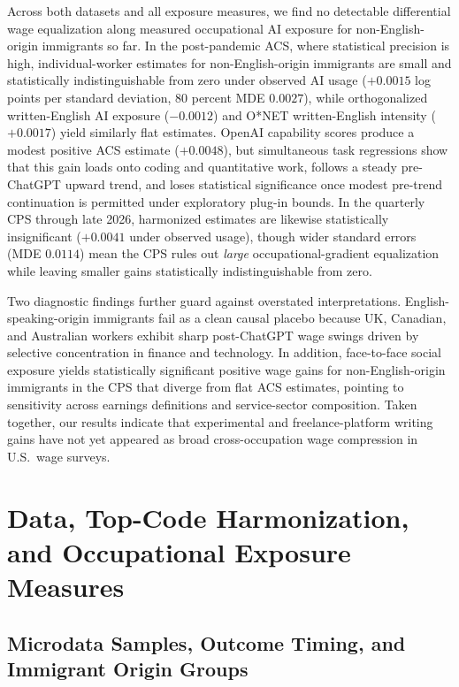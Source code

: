 \documentclass[11pt]{amsart}
\begin{document}
Across both datasets and all exposure measures, we find no detectable differential wage equalization along measured occupational AI exposure for non-English-origin immigrants so far. In the post-pandemic ACS, where statistical precision is high, individual-worker estimates for non-English-origin immigrants are small and statistically indistinguishable from zero under observed AI usage ($+0.0015$ log points per standard deviation, 80 percent MDE $0.0027$), while orthogonalized written-English AI exposure ($-0.0012$) and O*NET written-English intensity ($+0.0017$) yield similarly flat estimates. OpenAI capability scores \citep{Eloundou2024} produce a modest positive ACS estimate ($+0.0048$), but simultaneous task regressions show that this gain loads onto coding and quantitative work, follows a steady pre-ChatGPT upward trend, and loses statistical significance once modest pre-trend continuation is permitted under exploratory plug-in bounds. In the quarterly CPS through late 2026, harmonized estimates are likewise statistically insignificant ($+0.0041$ under observed usage), though wider standard errors (MDE $0.0114$) mean the CPS rules out \emph{large} occupational-gradient equalization while leaving smaller gains statistically indistinguishable from zero.

Two diagnostic findings further guard against overstated interpretations. English-speaking-origin immigrants fail as a clean causal placebo because UK, Canadian, and Australian workers exhibit sharp post-ChatGPT wage swings driven by selective concentration in finance and technology. In addition, face-to-face social exposure yields statistically significant positive wage gains for non-English-origin immigrants in the CPS that diverge from flat ACS estimates, pointing to sensitivity across earnings definitions and service-sector composition. Taken together, our results indicate that experimental and freelance-platform writing gains have not yet appeared as broad cross-occupation wage compression in U.S.\ wage surveys.

\section{Data, Top-Code Harmonization, and Occupational Exposure Measures}

\subsection{Microdata Samples, Outcome Timing, and Immigrant Origin Groups}
\end{document}
